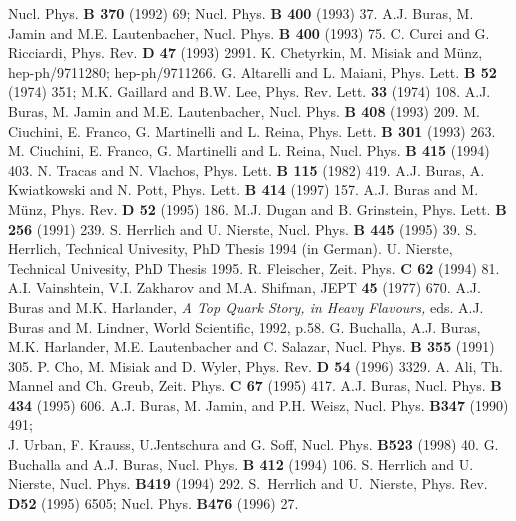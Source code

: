 \begin{thebibliography}{999}
{ Nucl. Phys.} {\bf B 370} (1992) 69;
{ Nucl. Phys.} {\bf B 400} (1993) 37.
{ A.J. Buras, M. Jamin and M.E. Lautenbacher,}
{ Nucl. Phys.} {\bf B 400} (1993) 75.
C. Curci and G. Ricciardi, { Phys. Rev.} {\bf D 47} (1993) 2991.
K. Chetyrkin, M. Misiak and M{\"u}nz, hep-ph/9711280; hep-ph/9711266.
G. Altarelli and L. Maiani, { Phys. Lett.} {\bf B 52} (1974) 351;
M.K. Gaillard and B.W. Lee, { Phys. Rev. Lett.} {\bf 33} (1974) 108.  
{ A.J. Buras, M. Jamin and M.E. Lautenbacher,}
{ Nucl. Phys.} {\bf B 408} (1993) 209.
{ M. Ciuchini, E. Franco, G. Martinelli and L. Reina,}
{ Phys. Lett.} {\bf B 301} (1993) 263.
{ M. Ciuchini, E. Franco, G. Martinelli and L. Reina,}
{ Nucl. Phys.} {\bf B 415} (1994) 403.
N. Tracas and N. Vlachos, { Phys. Lett.} {\bf B 115} (1982) 419.
A.J. Buras, A. Kwiatkowski and N. Pott, 
{ Phys. Lett.} {\bf B 414} (1997) 157.
{ A.J. Buras and M. M{\"u}nz,}
{ Phys. Rev.} {\bf D 52} (1995) 186.
M.J. Dugan and B. Grinstein,
 { Phys. Lett.} {\bf B 256} (1991) 239.
S. Herrlich and U. Nierste, { Nucl. Phys.} {\bf B 445} (1995) 39.
S. Herrlich, Technical Univesity, PhD Thesis 1994 (in German).
U. Nierste, Technical Univesity, PhD Thesis 1995.
R. Fleischer, { Zeit. Phys.} {\bf C 62} (1994) 81.
A.I. Vainshtein, V.I. Zakharov and M.A. Shifman, JEPT {\bf 45} (1977) 670.
{ A.J. Buras and M.K. Harlander,} {\it A Top Quark Story, in
Heavy Flavours,} eds. A.J. Buras and M. Lindner, World Scientific,
1992, p.58.
{ G. Buchalla, A.J. Buras, M.K. Harlander, M.E. Lautenbacher and C. Salazar,}
{ Nucl. Phys.} {\bf B 355} (1991) 305.
P. Cho, M. Misiak and D. Wyler, { Phys. Rev.} {\bf D 54} (1996) 3329.
A. Ali, Th. Mannel and Ch. Greub, { Zeit. Phys.} {\bf C 67} (1995) 417.
A.J. Buras, { Nucl. Phys.} {\bf B 434} (1995) 606.
{ A.J. Buras, M. Jamin, and P.H. Weisz,}
{ Nucl. Phys.} {\bf B347} (1990) 491;\\
J. Urban, F. Krauss, U.Jentschura and G. Soff, 
{ Nucl. Phys.} {\bf B523} (1998) 40. 
{ G. Buchalla and A.J. Buras,}
{ Nucl. Phys.} {\bf B 412} (1994) 106.
{ S. Herrlich and U. Nierste,}
{ Nucl. Phys.} {\bf B419} (1994) 292. 
{ S.~Herrlich and  U.~Nierste},
{ Phys. Rev.} {\bf D52} (1995) 6505; 
{ Nucl. Phys.} {\bf B476} (1996) 27. 

\end{thebibliography}
